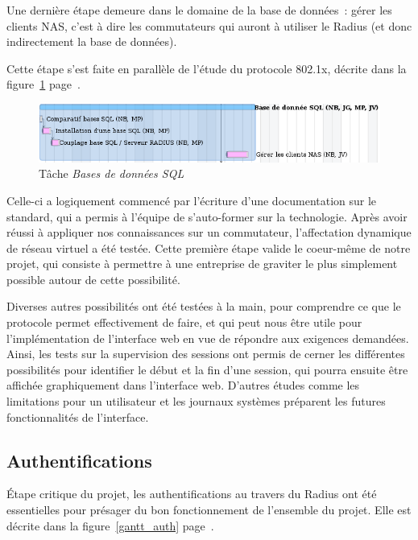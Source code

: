 Une dernière étape demeure dans le domaine de la base de données~: gérer les clients NAS, c'est à dire les commutateurs qui auront à utiliser le Radius (et donc indirectement la base de données).

Cette étape s'est faite en parallèle de l'étude du protocole 802.1x, décrite dans la figure~\ref{gantt_sql} page~\pageref{gantt_sql}.

\begin{figure}[!h]
	\label{gantt_sql}
	\begin{center}
		\includegraphics[width=350pt]{img/gantt_sql.png}
	\end{center}
	\caption{Tâche \textit{Bases de données SQL}}
\end{figure}


Celle-ci a logiquement commencé par l'écriture d'une documentation sur le standard, qui a permis à l'équipe de s'auto-former sur la technologie. Après avoir réussi à appliquer nos connaissances sur un commutateur, l'affectation dynamique de réseau virtuel a été testée. Cette première étape valide le coeur-même de notre projet, qui consiste à permettre à une entreprise de graviter le plus simplement possible autour de cette possibilité.

Diverses autres possibilités ont été testées à la main, pour comprendre ce que le protocole permet effectivement de faire, et qui peut nous être utile pour l'implémentation de l'interface web en vue de répondre aux exigences demandées. Ainsi, les tests sur la supervision des sessions ont permis de cerner les différentes possibilités pour identifier le début et la fin d'une session, qui pourra ensuite être affichée graphiquement dans l'interface web. D'autres études comme les limitations pour un utilisateur et les journaux systèmes préparent les futures fonctionnalités de l'interface.

\subsection{Authentifications}

Étape critique du projet, les authentifications au travers du Radius ont été essentielles pour présager du bon fonctionnement de l'ensemble du projet. Elle est décrite dans la figure~\ref{gantt_auth} page~\pageref{gantt_auth}.

